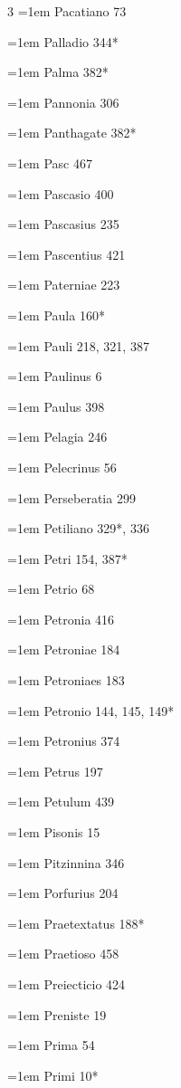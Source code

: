 \begin{multicols}{3}
\hangindent=1em Pacatiano 73\par
\hangindent=1em Palladio 344*\par
\hangindent=1em Palma 382*\par
\hangindent=1em Pannonia 306\par
\hangindent=1em Panthagate 382*\par
\hangindent=1em Pasc 467\par
\hangindent=1em Pascasio 400\par
\hangindent=1em Pascasius 235\par
\hangindent=1em Pascentius 421\par
\hangindent=1em Paterniae 223\par
\hangindent=1em Paula 160*\par
\hangindent=1em Pauli 218, 321, 387\par
\hangindent=1em Paulinus 6\par
\hangindent=1em Paulus 398\par
\hangindent=1em Pelagia 246\par
\hangindent=1em Pelecrinus 56\par
\hangindent=1em Perseberatia 299\par
\hangindent=1em Petiliano 329*, 336\par
\hangindent=1em Petri 154, 387*\par
\hangindent=1em Petrio 68\par
\hangindent=1em Petronia 416\par
\hangindent=1em Petroniae 184\par
\hangindent=1em Petroniaes 183\par
\hangindent=1em Petronio 144, 145, 149*\par
\hangindent=1em Petronius 374\par
\hangindent=1em Petrus 197\par
\hangindent=1em Petulum 439\par
\hangindent=1em Pisonis 15\par
\hangindent=1em Pitzinnina 346\par
\hangindent=1em Porfurius 204\par
\hangindent=1em Praetextatus 188*\par
\hangindent=1em Praetioso 458\par
\hangindent=1em Preiecticio 424\par
\hangindent=1em Preniste 19\par
\hangindent=1em Prima 54\par
\hangindent=1em Primi 10*\par

\end{multicols}
